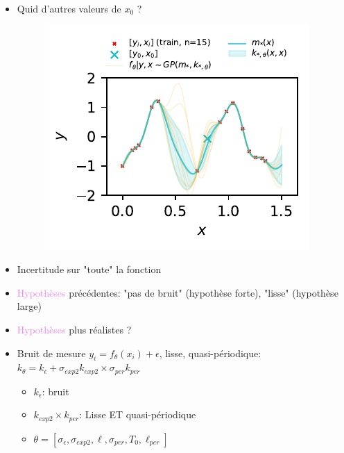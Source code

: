 \documentclass[xcolor=svgnames, t]{beamer}
\newcommand{\topurple}[1]{\textcolor{violet}{#1}}
\begin{document}
\begin{frame}{\subsecname}
  \begin{itemize}
    \item Quid d'autres valeurs de $x_0$ ?
      \begin{figure}
        \includegraphics{gp_1D_example_noisefree_pred_meanvar.pdf}
      \end{figure}
    \item Incertitude sur "toute" la fonction
  \end{itemize}
\end{frame}

\begin{frame}{\subsecname}
  \begin{itemize}
    \item \topurple{Hypothèses} précédentes: "pas de bruit" (hypothèse forte), "lisse" (hypothèse large)
    \pause
    \item \topurple{Hypothèses} plus réalistes ?
    \pause
    \item Bruit de mesure $y_i = f_{\theta}(x_i) + \epsilon$, lisse, quasi-périodique: $k_{\theta} = k_{\epsilon} + \sigma_{exp2} k_{exp2} \times \sigma_{per} k_{per}$
      \begin{itemize}
        \item $k_{\epsilon}$: bruit
        \item $k_{exp2} \times k_{per}$: Lisse ET quasi-périodique
        \item $\theta = [\sigma_{\epsilon}, \sigma_{exp2}, \ell, \sigma_{per}, T_0, \ell_{per}]$
      \end{itemize}
  \end{itemize}
\end{frame}
\end{document}
